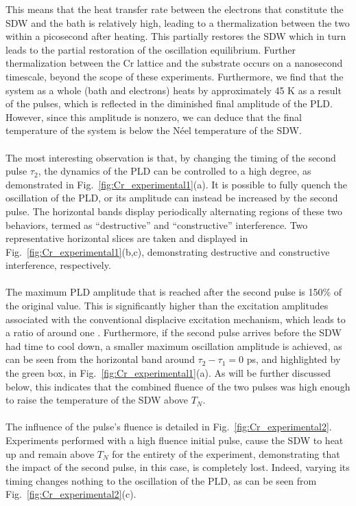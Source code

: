 This means that the heat transfer rate between the electrons that constitute the SDW and the bath is relatively high, leading to a thermalization between the two within a picosecond after heating.
This partially restores the SDW which in turn leads to the partial restoration of the oscillation equilibrium.
Further thermalization between the Cr lattice and the substrate occurs on a nanosecond timescale, beyond the scope of these experiments.
Furthermore, we find that the system as a whole (bath and electrons) heats by approximately 45 K as a result of the pulses, which is reflected in the diminished final amplitude of the PLD.
However, since this amplitude is nonzero, we can deduce that the final temperature of the system is below the N\'eel temperature of the SDW.
\\\\
The most interesting observation is that, by changing the timing of the second pulse $\tau_2$, the dynamics of the PLD can be controlled to a high degree, as demonstrated in Fig.~\ref{fig:Cr_experimental1}(a).
It is possible to fully quench the oscillation of the PLD, or its amplitude can instead be increased by the second pulse.
The horizontal bands display periodically alternating regions of these two behaviors, termed as ``destructive'' and ``constructive'' interference.
Two representative horizontal slices are taken and displayed in Fig.~\ref{fig:Cr_experimental1}(b,c), demonstrating destructive and constructive interference, respectively. 
\\\\
The maximum PLD amplitude that is reached after the second pulse is 150\% of the original value.
This is significantly higher than the excitation amplitudes associated with the conventional displacive excitation mechanism, which leads to a ratio of around one \cite{Singer2015prl,Zeiger1992}. 
Furthermore, if the second pulse arrives before the SDW had time to cool down, a smaller maximum oscillation amplitude is achieved, as can be seen from the horizontal band around $\tau_2 - \tau_1 = 0$ ps, and highlighted by the green box, in Fig.~\ref{fig:Cr_experimental1}(a).
As will be further discussed below, this indicates that the combined fluence of the two pulses was high enough to raise the temperature of the SDW above $T_N$.
\\\\
The influence of the pulse's fluence is detailed in Fig.~\ref{fig:Cr_experimental2}.
Experiments performed with a high fluence initial pulse, cause the SDW to heat up and remain above $T_N$ for the entirety of the experiment, demonstrating that the impact of the second pulse, in this case, is completely lost. Indeed, varying its timing changes nothing to the oscillation of the PLD, as can be seen from Fig.~\ref{fig:Cr_experimental2}(c).

